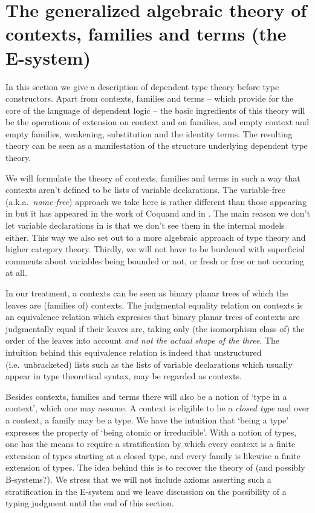 \section{The generalized algebraic theory of contexts, families and terms (the E-system)}\label{tt}
In this section we give a description of dependent type theory before type
constructors. Apart from contexts, families and terms -- which provide for the
core of the language of dependent logic -- the basic ingredients
of this theory will be the operations of extension on context and on families, 
and empty context and empty families, weakening, substitution
and the identity terms. The resulting theory can be seen as a manifestation of the 
structure underlying dependent type theory.

We will
formulate the theory of contexts, families and terms in such a way that contexts aren't defined
to be lists of variable declarations. The variable-free (a.k.a.~\emph{name-free}) approach 
we take here is rather different than those appearing in 
\cite{hofmann1995extensional,TheBook} but it has appeared in the work of Coquand
and in \cite{Dybjer1996}.
The main reason we don't let variable declarations in is that we don't see them 
in the internal models either. This way we also set out to a more algebraic 
approach of type theory and higher category theory. Thirdly, we will not have to
be burdened with superficial comments about variables being bounded or not, or 
fresh or free or not occuring at all.

In our treatment, a contexts can be seen as binary
planar trees of which the leaves are (families of) contexts. 
The judgmental equality relation on contexts is an equivalence relation which 
expresses that binary planar
trees of contexts are judgmentally equal if their leaves are, taking only
(the isomorphism class of) 
the order of the leaves into account \emph{and not the actual shape of the three}.
The intuition behind this equivalence relation is indeed that unstructured
(i.e.~unbracketed) lists such as the lists of variable declarations which
usually appear in type theoretical syntax, may be regarded as contexts.

Besides contexts, families and terms there will also be a notion of `type in
a context', which one may assume.
A context is eligible to be a \emph{closed type} and over a context, a family
may be a type. We have the intuition that `being a type'
expresses the property of `being atomic or irreducible'. With a notion of types,
one has the means to require a stratification by which every context is a finite
extension of types starting at a closed type, and every family is likewise a
finite extension of types. The idea behind this is to recover the theory of
\cite{Garner2014} {\color{red}(and possibly B-systems?)}. We stress that
we will not include axioms asserting such a stratification in the E-system
and we leave discussion on the possibility of a typing judgment until the
end of this section. 

